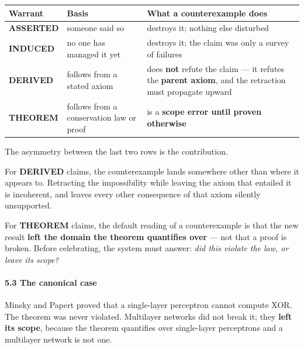 \documentclass[
  11pt,
  a4paper,
]{article}
\begin{document}
\begin{longtable}[]{@{}
  >{\raggedright\arraybackslash}p{}
  >{\raggedright\arraybackslash}p{}
  >{\raggedright\arraybackslash}p{}@{}}
\toprule\noalign{}
\begin{minipage}[b]{\linewidth}\raggedright
Warrant
\end{minipage} & \begin{minipage}[b]{\linewidth}\raggedright
Basis
\end{minipage} & \begin{minipage}[b]{\linewidth}\raggedright
What a counterexample does
\end{minipage} \\
\midrule\noalign{}
\endhead
\bottomrule\noalign{}
\endlastfoot
\textbf{ASSERTED} & someone said so & destroys it; nothing else
disturbed \\
\textbf{INDUCED} & no one has managed it yet & destroys it; the claim
was only a survey of failures \\
\textbf{DERIVED} & follows from a stated axiom & does \textbf{not}
refute the claim --- it refutes the \textbf{parent axiom}, and the
retraction must propagate upward \\
\textbf{THEOREM} & follows from a conservation law or proof & is a
\textbf{scope error until proven otherwise} \\
\end{longtable}

The asymmetry between the last two rows is the contribution.

For \textbf{DERIVED} claims, the counterexample lands somewhere other
than where it appears to. Retracting the impossibility while leaving the
axiom that entailed it is incoherent, and leaves every other consequence
of that axiom silently unsupported.

For \textbf{THEOREM} claims, the default reading of a counterexample is
that the new result \textbf{left the domain the theorem quantifies over}
--- not that a proof is broken. Before celebrating, the system must
answer: \emph{did this violate the law, or leave its scope?}

\paragraph{5.3 The canonical case}\label{the-canonical-case}

Minsky and Papert proved that a single-layer perceptron cannot compute
XOR. The theorem was never violated. Multilayer networks did not break
it; they \textbf{left its scope}, because the theorem quantifies over
single-layer perceptrons and a multilayer network is not one.
\end{document}
